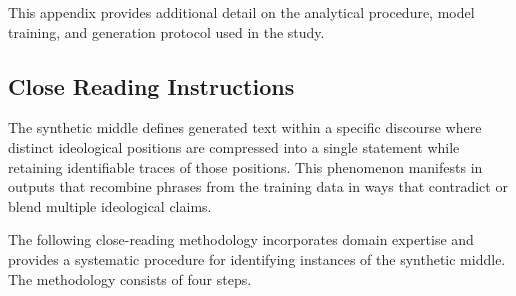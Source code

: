 \documentclass[anonymous,review]{acmart}
\begin{document}
This appendix provides additional detail on the analytical procedure, model training, and generation protocol used in the study.

\subsection{Close Reading Instructions}
\label{appendix:close-reading}

The synthetic middle defines generated text within a specific discourse where distinct ideological positions are compressed into a single statement while retaining identifiable traces of those positions. This phenomenon manifests in outputs that recombine phrases from the training data in ways that contradict or blend multiple ideological claims.

The following close-reading methodology incorporates domain expertise and provides a systematic procedure for identifying instances of the synthetic middle. The methodology consists of four steps.
\end{document}

